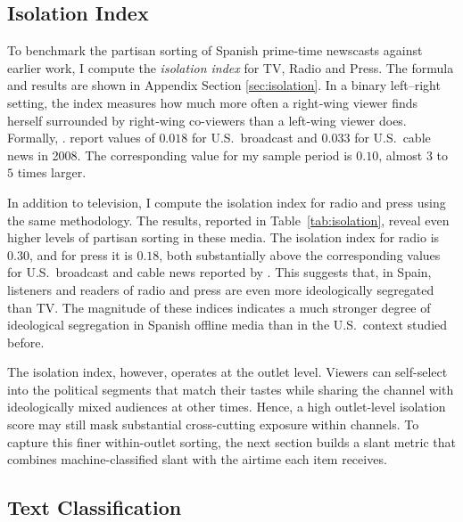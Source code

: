 \documentclass[12pt]{article}
\begin{document}
	
	
	
	\subsection*{Isolation Index}
	
	To benchmark the partisan sorting of Spanish prime‐time newscasts against earlier work, I compute the \emph{isolation index}  for TV, Radio and Press.  The formula and results are shown in Appendix Section \ref{sec:isolation}. In a binary left–right setting, the index measures how much more often a right‐wing viewer finds herself surrounded by right‐wing co-viewers than a left‐wing viewer does.  Formally,
.  \citet{gentzkow_isolation} report values of $0.018$ for U.S.\ broadcast and $0.033$ for U.S.\ cable news in 2008.  The corresponding value for my sample period is $0.10$, almost $3$ to $5$ times larger. 

In addition to television, I compute the isolation index for radio and press using the same methodology. The results, reported in Table~\ref{tab:isolation}, reveal even higher levels of partisan sorting in these media. The isolation index for radio is $0.30$, and for press it is $0.18$, both substantially above the corresponding values for U.S.\ broadcast and cable news reported by \citet{gentzkow_isolation}. This suggests that, in Spain, listeners and readers of radio and press are even more ideologically segregated than TV.  The magnitude of these indices indicates a much stronger degree of ideological segregation in Spanish offline media than in the U.S.\ context studied before.  
	
	The isolation index, however, operates at the outlet level.  
	Viewers can self-select into the political segments that match their tastes while sharing the channel with ideologically mixed audiences at other times.  
	Hence, a high outlet-level isolation score may still mask substantial cross-cutting exposure within channels.  
	To capture this finer within-outlet sorting, the next section builds a slant metric that combines machine-classified slant with the airtime each item receives.
	
	
	\subsection{Text Classification}
	
\end{document}
